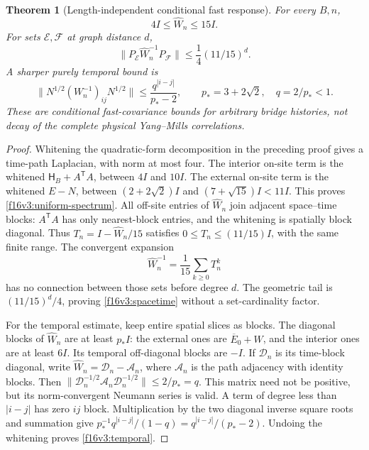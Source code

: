 \documentclass[11pt,oneside]{article}
\newtheorem{theorem}{Theorem}[section]
\begin{document}
\begin{theorem}[Length-independent conditional fast response]
\label{f16v3:locality}
For every \(B,n\),
\begin{equation}
                        4I\le\widehat W_n\le15I.
 \label{f16v3:uniform-spectrum}
\end{equation}
For sets \(\mathcal E,\mathcal F\) at graph distance \(d\),
\begin{equation}
 \|P_{\mathcal E}\widehat W_n^{-1}P_{\mathcal F}\|
                         \le\frac14(11/15)^d .
 \label{f16v3:spacetime}
\end{equation}
A sharper purely temporal bound is
\begin{equation}
 \|N^{1/2}(W_n^{-1})_{ij}N^{1/2}\|
       \le\frac{q^{|i-j|}}{p_*-2},
 \qquad p_*=3+2\sqrt2,\quad q=2/p_*<1.
 \label{f16v3:temporal}
\end{equation}
These are conditional fast-covariance bounds for arbitrary
bridge histories, not decay of the complete physical
Yang--Mills correlations.
\end{theorem}

\begin{proof}
Whitening the quadratic-form decomposition in the preceding
proof gives a time-path Laplacian, with norm at most four.
The interior on-site term is the whitened
\(\mathsf H_B+A^{\mathsf T}A\), between \(4I\) and \(10I\).
The external on-site term is the whitened \(E-N\), between
\((2+2\sqrt2)I\) and \((7+\sqrt{15})I<11I\).
This proves \eqref{f16v3:uniform-spectrum}.
All off-site entries of \(\widehat W_n\) join adjacent
space--time blocks: \(A^{\mathsf T}A\) has only nearest-block
entries, and the whitening is spatially block diagonal.
Thus \(T_n=I-\widehat W_n/15\) satisfies
\(0\le T_n\le(11/15)I\), with the same finite range.
The convergent expansion
\[
             \widehat W_n^{-1}=\frac1{15}\sum_{k\ge0}T_n^k
\]
has no connection between those sets before degree \(d\).
The geometric tail is \((11/15)^d/4\), proving
\eqref{f16v3:spacetime} without a set-cardinality factor.

For the temporal estimate, keep entire spatial slices as blocks.
The diagonal blocks of \(\widehat W_n\) are at least \(p_*I\):
the external ones are \(\overline E_0+W\), and the interior
ones are at least \(6I\). Its temporal off-diagonal blocks are
\(-I\). If \(\mathcal D_n\) is its time-block diagonal,
write \(\widehat W_n=\mathcal D_n-\mathcal A_n\), where
\(\mathcal A_n\) is the path adjacency with identity blocks.
Then
\(\|\mathcal D_n^{-1/2}\mathcal A_n\mathcal D_n^{-1/2}\|
\le2/p_*=q\).
This matrix need not be positive, but its norm-convergent
Neumann series is valid. A term of degree less than
\(|i-j|\) has zero \(ij\) block.
Multiplication by the two diagonal inverse square roots and
summation give
\(p_*^{-1}q^{|i-j|}/(1-q)=q^{|i-j|}/(p_*-2)\).
Undoing the whitening proves \eqref{f16v3:temporal}.
\end{proof}
\end{document}
